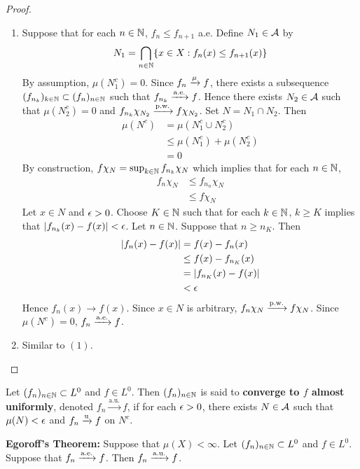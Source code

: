 \documentclass{book}
\begin{document}
	\begin{proof}\
		\begin{enumerate}
			\item Suppose that for each $n \in \mathbb{N}$, $f_n \leq f_{n+1}$ a.e. Define $N_1 \in \mathcal{A}$ by 
			$$N_1 = \bigcap_{n \in \mathbb{N}} \{x \in X: f_n(x) \leq f_{n+1}(x)\}$$ 
			By assumption, $\mu(N_1^c) = 0$. Since $f_n \xrightarrow{\mu} f$, there exists a subsequence $(f_{n_k})_{k \in \mathbb{N}} \subset (f_n)_{n \in \mathbb{N}}$ such that $f_{n_k} \xrightarrow{\text{a.e.}} f$. Hence there exists $N_2 \in \mathcal{A}$ such that $\mu(N_2^c) = 0$ and $f_{n_k} \chi_{N_2} \xrightarrow{\text{p.w.}} f \chi_{N_2}$. Set $N = N_1 \cap N_2$. Then 
			\begin{align*}
				\mu(N^c)
				& = \mu(N_1^c \cup N_2^c) \\
				& \leq \mu(N_1^c) + \mu(N_2^c) \\
				& = 0
			\end{align*}
			By construction, $f \chi_N = \sup_{k \in \mathbb{N}} f_{n_k} \chi_N$ which implies that for each $n \in \mathbb{N}$, 
			\begin{align*}
				f_n \chi_N
				& \leq f_{n_n} \chi_N \\ 
				& \leq f \chi_N
			\end{align*}
			Let $x \in N$ and $\epsilon > 0$. Choose $K \in \mathbb{N}$ such that for each $k \in \mathbb{N}$, $k \geq K$ implies that $|f_{n_k}(x) - f(x)| < \epsilon$. Let $n \in \mathbb{N}$. Suppose that $n \geq n_K$. Then 
			\begin{align*}
				|f_{n}(x) - f(x)|
				& = f(x) - f_{n}(x) \\
				& \leq f(x) - f_{n_K}(x) \\
				& = |f_{n_K}(x) - f(x)| \\
				& < \epsilon 
			\end{align*}
			Hence $f_n(x) \rightarrow f(x)$. Since $x \in N$ is arbitrary, $f_n \chi_N \xrightarrow{\text{p.w.}} f \chi_N$. Since $\mu(N^c) = 0$, $f_n \xrightarrow{\text{a.e.}} f$.
			\item Similar to $(1)$. 
		\end{enumerate}
	\end{proof}
	
	
	\begin{defn}  
		 Let $(f_n)_{n \in \mathbb{N}} \subset L^0$ and $f \in L^0$. Then $(f_n)_{n \in \mathbb{N}}$ is said to \textbf{converge to $f$ almost uniformly}, denoted $f_n \xrightarrow{\text{a.u.}} f$, if for each $\epsilon >0$, there exists $N \in \mathcal{A}$ such that $\mu(N) < \epsilon$ and $f_n \xrightarrow{\text{u}} f$ on $N^c$. 
	\end{defn}	
	
	\begin{ex}  \textbf{Egoroff's Theorem:}
		Suppose that $\mu(X) < \infty$. Let $(f_n)_{n \in \mathbb{N}} \subset L^0$ and $f \in L^0$. Suppose that $f_n \xrightarrow{\text{a.e.}} f$. Then $f_n \xrightarrow{\text{a.u.}} f$.
	\end{ex}
	
\end{document}
